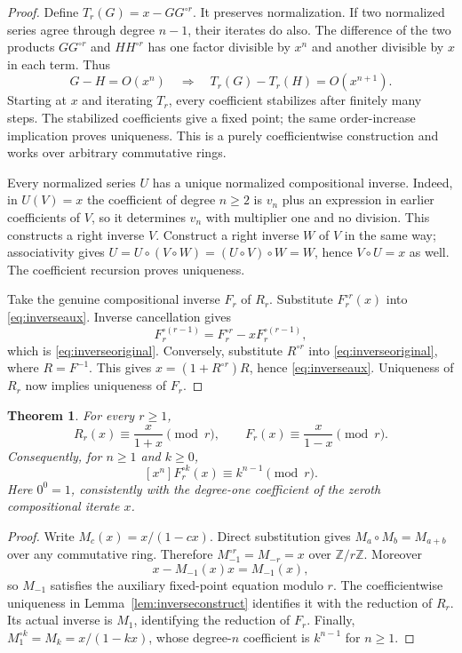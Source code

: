 \documentclass[11pt,a4paper]{article}
\newtheorem{theorem}{Theorem}[section]
\theoremstyle{remark}
\newcommand{\Z}{\mathbb Z}
\begin{document}
\begin{proof}
Define $T_r(G)=x-GG^{\circ r}$. It preserves normalization. If two
normalized series agree through degree $n-1$, their iterates do also.
The difference of the two products $GG^{\circ r}$ and $HH^{\circ r}$
has one factor divisible by $x^n$ and another divisible by $x$ in
each term. Thus
\[
G-H=O(x^n)\quad\Longrightarrow\quad
T_r(G)-T_r(H)=O(x^{n+1}).
\]
Starting at $x$ and iterating $T_r$, every coefficient stabilizes after
finitely many steps. The stabilized coefficients give a fixed point;
the same order-increase implication proves uniqueness. This is a
purely coefficientwise construction and works over arbitrary
commutative rings.

Every normalized series $U$ has a unique normalized compositional inverse.
Indeed, in $U(V)=x$ the coefficient of degree $n\ge2$ is $v_n$ plus
an expression in earlier coefficients of $V$, so it determines $v_n$
with multiplier one and no division. This constructs a right inverse
$V$. Construct a right inverse $W$ of $V$ in the same way; associativity
gives $U=U\circ(V\circ W)=(U\circ V)\circ W=W$, hence $V\circ U=x$
as well. The coefficient recursion proves uniqueness.

Take the genuine compositional inverse $F_r$ of $R_r$. Substitute
$F_r^{\circ r}(x)$ into \eqref{eq:inverseaux}. Inverse cancellation
gives
\[
F_r^{\circ(r-1)}=F_r^{\circ r}-xF_r^{\circ(r-1)},
\]
which is \eqref{eq:inverseoriginal}. Conversely, substitute
$R^{\circ r}$ into \eqref{eq:inverseoriginal}, where $R=F^{-1}$.
This gives $x=(1+R^{\circ r})R$, hence \eqref{eq:inverseaux}.
Uniqueness of $R_r$ now implies uniqueness of $F_r$.
\end{proof}

\begin{theorem}\label{thm:inversemod}
For every $r\ge1$,
\[
R_r(x)\equiv\frac{x}{1+x}\pmod r,\qquad
F_r(x)\equiv\frac{x}{1-x}\pmod r.
\]
Consequently, for $n\ge1$ and $k\ge0$,
\begin{equation}\label{eq:iteratemod}
[x^n]F_r^{\circ k}(x)\equiv k^{n-1}\pmod r.
\end{equation}
Here $0^0=1$, consistently with the degree-one coefficient of the
zeroth compositional iterate $x$.
\end{theorem}

\begin{proof}
Write $M_c(x)=x/(1-cx)$. Direct substitution gives
$M_a\circ M_b=M_{a+b}$ over any commutative ring. Therefore
$M_{-1}^{\circ r}=M_{-r}=x$ over $\Z/r\Z$. Moreover
\[
x-M_{-1}(x)x=M_{-1}(x),
\]
so $M_{-1}$ satisfies the auxiliary fixed-point equation modulo $r$.
The coefficientwise uniqueness in Lemma~\ref{lem:inverseconstruct}
identifies it with the reduction of $R_r$. Its actual inverse is
$M_1$, identifying the reduction of $F_r$. Finally,
$M_1^{\circ k}=M_k=x/(1-kx)$, whose degree-$n$ coefficient is
$k^{n-1}$ for $n\ge1$.
\end{proof}
\end{document}
